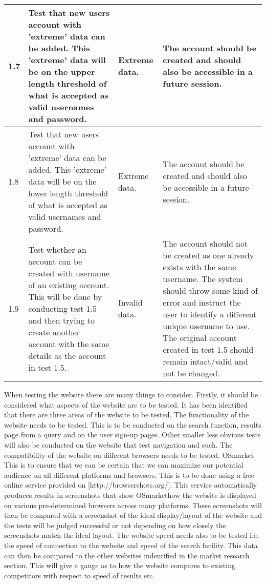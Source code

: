 \begin{tabular}{ | l | p{4cm} |  p{4cm} | p{4cm} |}
1.7	& Test that new users account with 'extreme' data can be added. This 'extreme' data will be on the upper length threshold of what is accepted as valid usernames and password. &	Extreme data. &	The account should be created and should also be accessible in a future session.\\ \hline

1.8	& Test that new users account with 'extreme' data can be added. This 'extreme' data will be on the lower length threshold of what is accepted as valid usernames and password. &	Extreme data.& The account should be created and should also be accessible in a future session.\\ \hline

1.9	& Test whether an account can be created with username of an existing account. This will be done by conducting test 1.5 and then trying to create another account with the same details as the account in test 1.5.	& Invalid data.&	The account should not be created as one already exists with the same username. The system should throw some kind of error and instruct the user to identify a different unique username to use. The original account created in test 1.5 should remain intact/valid and not be changed.\\
    \hline
    \end{tabular}

When testing the website there are many things to consider. 
Firstly, it should be considered what aspects of the website are to be tested. 
It has been identified that there are three areas of the website to be tested. 
The functionality of the website needs to be tested. 
This is to be conducted on the search function, results page from a query and on 
the user sign-up pages. 
Other smaller less obvious tests will also be conducted on the website that test 
navigation and such.
The compatibility of the website on different browsers needs to be tested. OSmarket
This is to ensure that we can be certain that we can maximize our potential audience on 
all different platforms and browsers. 
This is to be done using a free online service provided on [http://browsershots.org/]. 
This service automatically produces results in screenshots that show OSmarkethow the website 
is displayed on various pre-determined browsers across many platforms. 
These screenshots will then be compared with a screenshot of the ideal display/layout 
of the website and the tests will be judged successful or not depending on how closely 
the screenshots match the ideal layout.
The website speed needs also to be tested i.e. the speed of connection to the website 
and speed of the search facility. 
This data can then be compared to the other websites indentified in the market
research section. This will give a gauge as to how the website compares to existing 
competitors with respect to speed of results etc.

